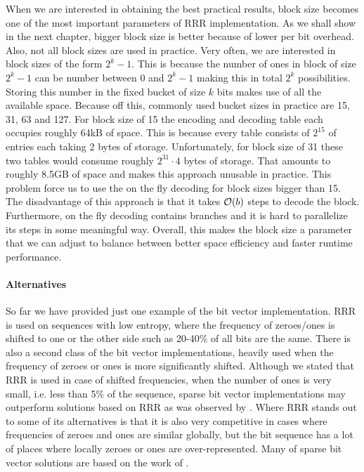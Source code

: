 When we are interested in obtaining the best practical results, block size becomes
one of the most important parameters of RRR implementation. As we shall show in the next
chapter, bigger block size is better because of lower per bit overhead. Also, not all block
sizes are used in practice. Very often, we are interested in block sizes of the form $2^k-1$.
This is because the number of ones in block of size $2^k-1$ can be number between 0 and $2^k-1$
making this in total $2^k$ possibilities. Storing this number in the fixed bucket of size
$k$ bits makes use of all the available space. Because off this, commonly used bucket sizes in
practice are 15, 31, 63 and 127. For block size of 15 the encoding and decoding table
each occupies roughly 64kB of space. This is because every table consists of $2^{15}$ of entries
each taking 2 bytes of storage. Unfortunately, for block size of 31 these two tables would consume
roughly $2^{31}\cdot 4$ bytes of storage. That amounts to roughly 8.5GB of space and makes this approach
unusable in practice. This problem force us to use the on the fly decoding for block sizes
bigger than 15. The disadvantage of this approach is that it takes $\mathcal{O}(b)$ steps to decode the block.
Furthermore, on the fly decoding contains branches and it is hard to parallelize its steps in some meaningful
way. Overall, this makes the block size a parameter that we can adjust to balance between better space
efficiency and faster runtime performance.

\paragraph{Alternatives}

So far we have provided just one example of the bit vector implementation.
RRR is used on sequences with low entropy, where the frequency of zeroes/ones
is shifted to one or the other side such as 20-40\% of all bits are the same.
There is also a second class of the bit vector implementations, heavily
used when the frequency of zeroes or ones is more significantly shifted.
Although we stated that RRR is used in case of shifted frequencies, when the number
of ones is very small, i.e. less than 5\% of the sequence, sparse bit vector
implementations may outperform solutions based on RRR as was observed by \cite{navarro2012fast}.
Where RRR stands out to some of its alternatives is that it is also very competitive
in cases where frequencies of zeroes and ones are similar globally, but the bit
sequence has a lot of places where locally zeroes or ones are over-represented.
Many of sparse bit vector solutions are based on the work of \cite{okanohara2007practical}.